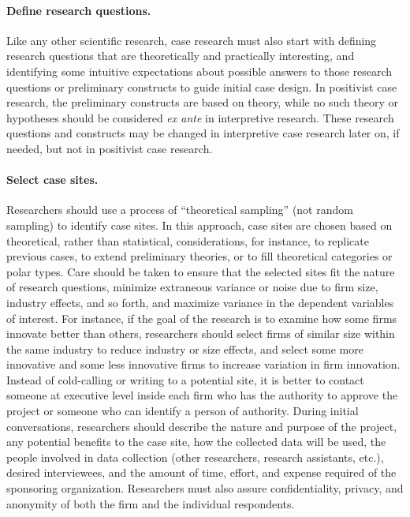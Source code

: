 \paragraph{Define research questions.} Like any other scientific research, case research must also start with defining research questions that are theoretically and practically interesting, and identifying some intuitive expectations about possible answers to those research questions or preliminary constructs to guide initial case design. In positivist case research, the preliminary constructs are based on theory, while no such theory or hypotheses should be considered \textit{ex ante} in interpretive research. These research questions and constructs may be changed in interpretive case research later on, if needed, but not in positivist case research.

\paragraph{Select case sites.} Researchers should use a process of ``theoretical sampling'' (not random sampling) to identify case sites. In this approach, case sites are chosen based on theoretical, rather than statistical, considerations, for instance, to replicate previous cases, to extend preliminary theories, or to fill theoretical categories or polar types. Care should be taken to ensure that the selected sites fit the nature of research questions, minimize extraneous variance or noise due to firm size, industry effects, and so forth, and maximize variance in the dependent variables of interest. For instance, if the goal of the research is to examine how some firms innovate better than others, researchers should select firms of similar size within the same industry to reduce industry or size effects, and select some more innovative and some less innovative firms to increase variation in firm innovation. Instead of cold-calling or writing to a potential site, it is better to contact someone at executive level inside each firm who has the authority to approve the project or someone who can identify a person of authority. During initial conversations, researchers should describe the nature and purpose of the project, any potential benefits to the case site, how the collected data will be used, the people involved in data collection (other researchers, research assistants, etc.), desired interviewees, and the amount of time, effort, and expense required of the sponsoring organization. Researchers must also assure confidentiality, privacy, and anonymity of both the firm and the individual respondents.

